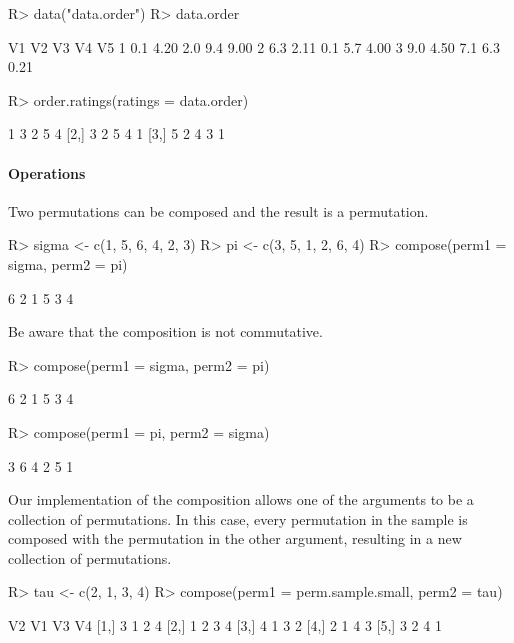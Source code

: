 \documentclass[article,nojss]{jss}
\begin{document}
\begin{Schunk}
\begin{Sinput}
R> data("data.order")
R> data.order
\end{Sinput}
\begin{Soutput}
   V1   V2  V3  V4   V5
1 0.1 4.20 2.0 9.4 9.00
2 6.3 2.11 0.1 5.7 4.00
3 9.0 4.50 7.1 6.3 0.21
\end{Soutput}
\begin{Sinput}
R> order.ratings(ratings = data.order)
\end{Sinput}
\begin{Soutput}
     [,1] [,2] [,3] [,4] [,5]
[1,]    1    3    2    5    4
[2,]    3    2    5    4    1
[3,]    5    2    4    3    1
\end{Soutput}
\end{Schunk}

\paragraph*{Operations} 
Two permutations can be composed and the result is a permutation. 
\begin{Schunk}
\begin{Sinput}
R> sigma <- c(1, 5, 6, 4, 2, 3)
R> pi <- c(3, 5, 1, 2, 6, 4)
R> compose(perm1 = sigma, perm2 = pi)
\end{Sinput}
\begin{Soutput}
[1] 6 2 1 5 3 4
\end{Soutput}
\end{Schunk}

Be aware that the composition is not commutative. 
\begin{Schunk}
\begin{Sinput}
R> compose(perm1 = sigma, perm2 = pi)
\end{Sinput}
\begin{Soutput}
[1] 6 2 1 5 3 4
\end{Soutput}
\begin{Sinput}
R> compose(perm1 = pi, perm2 = sigma)
\end{Sinput}
\begin{Soutput}
[1] 3 6 4 2 5 1
\end{Soutput}
\end{Schunk}

Our implementation of the composition allows one of the arguments to be a collection of permutations. In this case, every permutation in the sample is composed with the permutation in the other argument, resulting in a new collection of permutations. 
\begin{Schunk}
\begin{Sinput}
R> tau <- c(2, 1, 3, 4)
R> compose(perm1 = perm.sample.small, perm2 = tau)
\end{Sinput}
\begin{Soutput}
     V2 V1 V3 V4
[1,]  3  1  2  4
[2,]  1  2  3  4
[3,]  4  1  3  2
[4,]  2  1  4  3
[5,]  3  2  4  1
\end{Soutput}
\end{Schunk}
\end{document}

